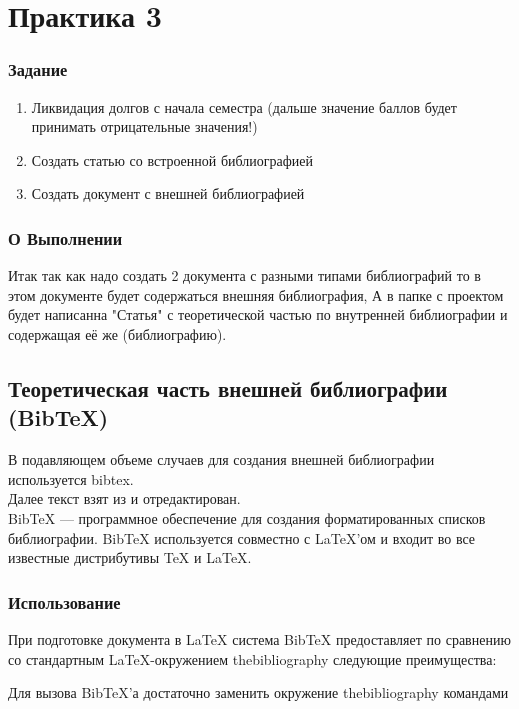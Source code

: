 \documentclass[a4paper,14pt,oneside]{book}
\theoremstyle{plain} %
\theoremstyle{definition} %
\theoremstyle{remark} %
\begin{document}
\chapter{Практика 3}
\subsection{Задание}
\begin{enumerate}
\item Ликвидация долгов с начала семестра (дальше значение баллов будет принимать отрицательные значения!) 
\item Создать статью со встроенной библиографией 
\item Создать документ с внешней библиографией 
\end{enumerate}
\subsection{О Выполнении}
Итак так как надо создать 2 документа с разными типами библиографий то в этом документе будет содержаться внешняя библиография, А в папке с проектом будет написанна "Статья" с теоретической частью по внутренней библиографии и  содержащая её же (библиографию).
\section{Теоретическая часть внешней библиографии (BibTeX)}
В подавляющем объеме случаев для создания внешней библиографии используется bibtex.\\
Далее текст взят из \cite{wiki1} и отредактирован.\\
BibTeX — программное обеспечение для создания форматированных списков библиографии. BibTeX используется совместно с LaTeX'ом и входит во все известные дистрибутивы TeX и LaTeX.
\subsection{Использование}
При подготовке документа в LaTeX система BibTeX предоставляет по сравнению со стандартным LaTeX-окружением thebibliography следующие преимущества:
Для вызова BibTeX’а достаточно заменить окружение thebibliography командами\\
\end{document}

